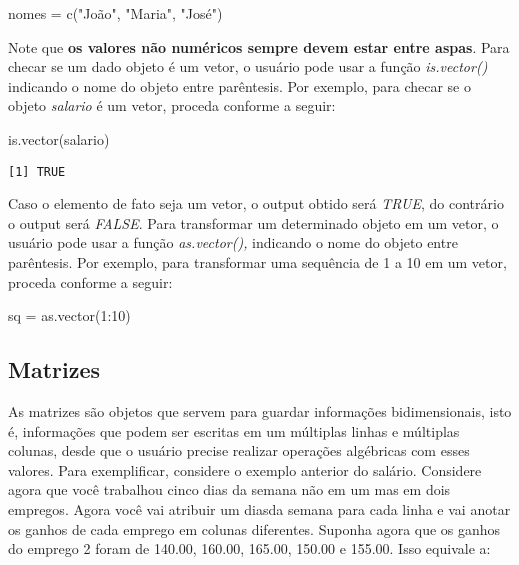 \documentclass[
  letterpaper,
  DIV=11,
  numbers=noendperiod]{scrreprt}
\newenvironment{Shaded}{\begin{snugshade}}{\end{snugshade}}
\newcommand{\DecValTok}[1]{\textcolor[rgb]{0.68,0.00,0.00}{#1}}
\newcommand{\FunctionTok}[1]{\textcolor[rgb]{0.28,0.35,0.67}{#1}}
\newcommand{\NormalTok}[1]{\textcolor[rgb]{0.00,0.23,0.31}{#1}}
\newcommand{\OtherTok}[1]{\textcolor[rgb]{0.00,0.23,0.31}{#1}}
\newcommand{\SpecialCharTok}[1]{\textcolor[rgb]{0.37,0.37,0.37}{#1}}
\newcommand{\StringTok}[1]{\textcolor[rgb]{0.13,0.47,0.30}{#1}}
\begin{document}
\begin{Shaded}
\begin{Highlighting}[]
\NormalTok{nomes }\OtherTok{=} \FunctionTok{c}\NormalTok{(}\StringTok{"João"}\NormalTok{, }\StringTok{"Maria"}\NormalTok{, }\StringTok{"José"}\NormalTok{)}
\end{Highlighting}
\end{Shaded}

Note que \textbf{os valores não numéricos sempre devem estar entre
aspas}. Para checar se um dado objeto é um vetor, o usuário pode usar a
função \emph{is.vector()} indicando o nome do objeto entre parêntesis.
Por exemplo, para checar se o objeto \emph{salario} é um vetor, proceda
conforme a seguir:

\begin{Shaded}
\begin{Highlighting}[]
\FunctionTok{is.vector}\NormalTok{(salario)}
\end{Highlighting}
\end{Shaded}

\begin{verbatim}
[1] TRUE
\end{verbatim}

Caso o elemento de fato seja um vetor, o output obtido será \emph{TRUE},
do contrário o output será \emph{FALSE}. Para transformar um determinado
objeto em um vetor, o usuário pode usar a função \emph{as.vector(),}
indicando o nome do objeto entre parêntesis. Por exemplo, para
transformar uma sequência de 1 a 10 em um vetor, proceda conforme a
seguir:

\begin{Shaded}
\begin{Highlighting}[]
\NormalTok{sq }\OtherTok{=} \FunctionTok{as.vector}\NormalTok{(}\DecValTok{1}\SpecialCharTok{:}\DecValTok{10}\NormalTok{)}
\end{Highlighting}
\end{Shaded}

\subsection{Matrizes}\label{matrizes}

As matrizes são objetos que servem para guardar informações
bidimensionais, isto é, informações que podem ser escritas em um
múltiplas linhas e múltiplas colunas, desde que o usuário precise
realizar operações algébricas com esses valores. Para exemplificar,
considere o exemplo anterior do salário. Considere agora que você
trabalhou cinco dias da semana não em um mas em dois empregos. Agora
você vai atribuir um diasda semana para cada linha e vai anotar os
ganhos de cada emprego em colunas diferentes. Suponha agora que os
ganhos do emprego 2 foram de 140.00, 160.00, 165.00, 150.00 e 155.00.
Isso equivale a:
\end{document}
